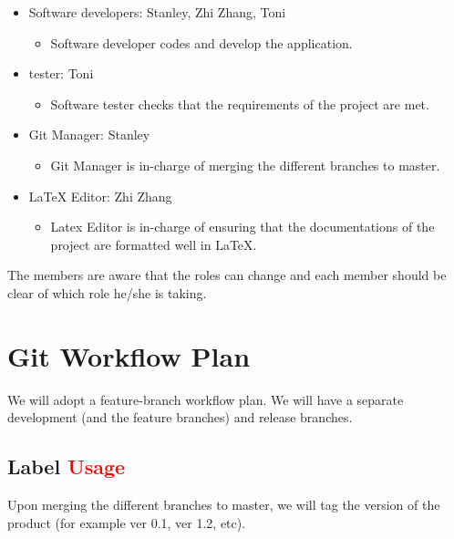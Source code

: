\documentclass{article}
\begin{document}
\begin{itemize}
    \item Software developers: Stanley, Zhi Zhang, Toni
    \begin{itemize}
        \item Software developer codes and develop the application.
    \end{itemize}
\end{itemize}

\begin{itemize}
    \item tester: Toni
    \begin{itemize}
        \item Software tester checks that the requirements of the project are met.
    \end{itemize}
\end{itemize}

\begin{itemize}
    \item Git Manager: Stanley
    \begin{itemize}
        \item Git Manager is in-charge of merging the different branches to master.
    \end{itemize}
\end{itemize}

\begin{itemize}
    \item LaTeX Editor: Zhi Zhang
    \begin{itemize}
        \item Latex Editor is in-charge of ensuring that the documentations of the project are formatted well in LaTeX.
    \end{itemize}
\end{itemize}

The members are aware that the roles can change and each member should be clear of which role he/she is taking.

\section{Git Workflow Plan}
We will adopt a feature-branch workflow plan. We will have a separate development (and the feature branches) and release branches.

\subsection{Label \textcolor{red}{Usage}}
Upon merging the different branches to master, we will tag the version of the product (for example ver 0.1, ver 1.2, etc).
\end{document}
